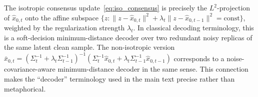 \documentclass{article}
\theoremstyle{plain}
\theoremstyle{definition}
\theoremstyle{remark}
\begin{document}
The isotropic consensus update~\eqref{eq:iso_consensus} is precisely the
\(L^2\)-projection of \(\hat x_{0,t}\) onto the affine subspace
\(\{z : \|z - \hat x_{0,t}\|^2 + \lambda_t\|z - \hat x_{0,t-1}\|^2 =
\mathrm{const}\}\), weighted by the regularization strength \(\lambda_t\).
In classical decoding terminology, this is a soft-decision minimum-distance
decoder over two redundant noisy replicas of the same latent clean sample.
The non-isotropic version
\(\bar x_{0,t} = (\Sigma_t^{-1}+\lambda_t\Sigma_{t-1}^{-1})^{-1}(\Sigma_t^{-1}
\hat x_{0,t} + \lambda_t\Sigma_{t-1}^{-1}\hat x_{0,t-1})\)
corresponds to a noise-covariance-aware minimum-distance decoder in the
same sense. This connection makes the ``decoder'' terminology used in the
main text precise rather than metaphorical.
\end{document}
